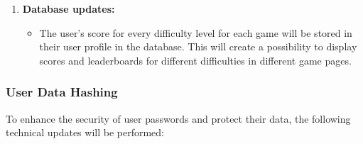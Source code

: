 \documentclass[11pt,a4paper]{article}
\begin{document}
\begin{enumerate}
\begin{itemize}
    \end{itemize}
    \item \textbf{Database updates:}
    \begin{itemize}
        \item The user's score for every difficulty level for each game will be stored in their user profile in the database. This will create a possibility to display scores and leaderboards for different difficulties in different game pages. 
    \end{itemize}
\end{enumerate}

\subsubsection{User Data Hashing}
To enhance the security of user passwords and protect their data, the following technical updates will be performed:
\end{document}

